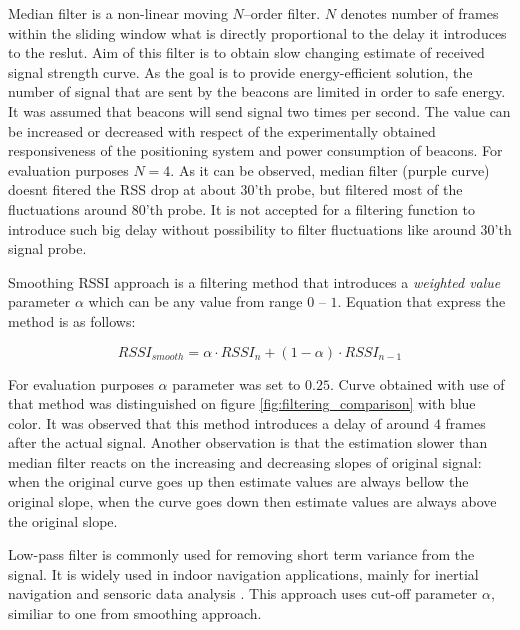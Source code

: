 \documentclass[../main.tex]{subfiles}
\begin{document}
Median filter is a non-linear moving $N$--order filter. $N$ denotes number of frames within the sliding window what is directly proportional to the delay it introduces to the reslut. Aim of this filter is to obtain slow changing estimate of received signal strength curve. As the goal is to provide energy-efficient solution, the number of signal that are sent by the beacons are limited in order to safe energy. It was assumed that beacons will send signal two times per second. The value can be increased or decreased with respect of the experimentally obtained responsiveness of the positioning system and power consumption of beacons. For evaluation purposes $N=4$. As it can be observed, median filter (purple curve) doesnt fitered the RSS drop at about $30$'th probe, but filtered most of the fluctuations around $80$'th probe. It is not accepted for a filtering function to introduce such big delay without possibility to filter fluctuations like around $30$'th signal probe.

Smoothing RSSI approach \cite{rssi_smoothing} is a filtering method that introduces a \textit{weighted value} parameter $\alpha$ which can be any value from range $0$ -- $1$. Equation that express the method is as follows:

\begin{equation}
\label{eq:rssi_smoothing}
	RSSI_{smooth} = \alpha \cdot RSSI_n + (1 - \alpha) \cdot RSSI_{n-1}
\end{equation}

For evaluation purposes $\alpha$ parameter was set to $0.25$. Curve obtained with use of that method was distinguished on figure \ref{fig:filtering_comparison} with blue color. It was observed that this method introduces a delay of around $4$ frames after the actual signal. Another observation is that the estimation slower than median filter reacts on the increasing and decreasing slopes of original signal: when the original curve goes up then estimate values are always bellow the original slope, when the curve goes down then estimate values are always above the original slope.

Low-pass filter is commonly used for removing short term variance from the signal. It is widely used in indoor navigation applications, mainly for inertial navigation and sensoric data analysis \cite{indoor_positioning_for_ar}\cite{indoor_navi_for_android2}\cite{report_indoor_navi_for_smartphones}\cite{thesis_ins_algorithms_for_android}\cite{indoor_positioning_for_ar_PhD_GOOD}. This approach uses cut-off parameter $\alpha$, similiar to one from smoothing approach.
\end{document}

